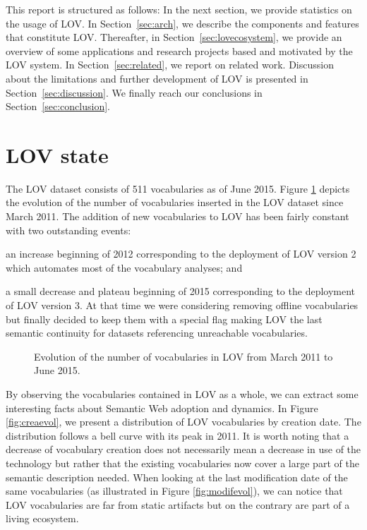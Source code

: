 \documentclass{iosart2c}
\begin{document}
This report is structured as follows: In the next section, we provide statistics on the usage of LOV. In Section~\ref{sec:arch}, we describe the components and features that constitute LOV. Thereafter,  in Section~\ref{sec:lovecosystem}, we provide an overview of some applications and research projects based and motivated by the LOV system. In Section~\ref{sec:related}, we report on related work. Discussion about the limitations and further development of LOV is presented in Section~\ref{sec:discussion}. We finally reach our conclusions in Section~\ref{sec:conclusion}.

\section{LOV state}\label{sec:state}
The LOV dataset consists of 511 vocabularies as of June 2015. Figure \ref{fig:evolLOV} depicts the evolution of the number of vocabularies inserted in the LOV dataset since March 2011. The addition of new vocabularies to LOV has been fairly constant with two outstanding events: 
\begin{inparaenum}[1)] 
	\item an increase beginning of 2012 corresponding to the deployment of LOV version 2 which automates most of the vocabulary analyses; and
	\item a small decrease and plateau beginning of 2015 corresponding to the deployment of LOV version 3. At that time we were considering  removing offline vocabularies but finally decided to keep them with a special flag making LOV the last semantic continuity for datasets referencing unreachable vocabularies.
\end{inparaenum} 

\begin{figure}[htb]
   \resizebox{1.04\linewidth}{!}{}
   \caption{\label{fig:evolLOV} Evolution of the number of vocabularies in LOV from March 2011 to June 2015.}
\end{figure}



By observing the vocabularies contained in LOV as a whole, we can extract some interesting facts about Semantic Web adoption and dynamics. In Figure \ref{fig:creaevol}, we present a distribution of LOV vocabularies by creation date. The distribution follows a bell curve with its peak in 2011. It is worth noting that a decrease of vocabulary creation does not necessarily mean a decrease in use of the technology but rather that the existing vocabularies now cover a large part of the semantic description needed. When looking at the last modification date of the same vocabularies (as illustrated in Figure \ref{fig:modifevol}), we can notice that LOV vocabularies are far from static artifacts but on the contrary are part of a living ecosystem. 
\end{document}
